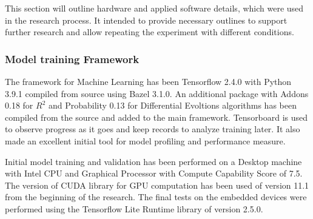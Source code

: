 This section will outline hardware and applied software details, which were used in the research process.
It intended to provide necessary outlines to support further research and allow repeating the experiment with different conditions.
\subsubsection{Model training Framework}
The framework for Machine Learning has been Tensorflow 2.4.0 with Python 3.9.1 compiled from source using Bazel 3.1.0.
An additional package with Addons 0.18 for $R^2$ and Probability 0.13 for Differential Evoltions algorithms has been compiled from the source and added to the main framework.
Tensorboard is used to observe progress as it goes and keep records to analyze training later. It also made an excellent initial tool for model profiling and performance measure.

%
%
Initial model training and validation has been performed on a Desktop machine with Intel CPU and Graphical Processor with Compute Capability Score of 7.5. The version of CUDA library for GPU computation has been used of version 11.1 from the beginning of the research.
The final tests on the embedded devices were performed using the Tensorflow Lite Runtime library of version 2.5.0.
%

